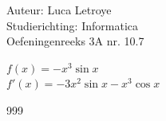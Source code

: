 \documentclass[a4paper]{article}
\begin{document}
  
\noindent \large Auteur: Luca Letroye        \\
\noindent \large Studierichting: Informatica \\
\noindent \large Oefeningenreeks 3A nr. 10.7 \\

\medskip

\normalsize

$f(x) = -x^3\sin x$\\

$f'(x) = -3x^2\sin x - x^3 \cos x$


\begin{thebibliography}{999}
\end{thebibliography}
\end{document}
